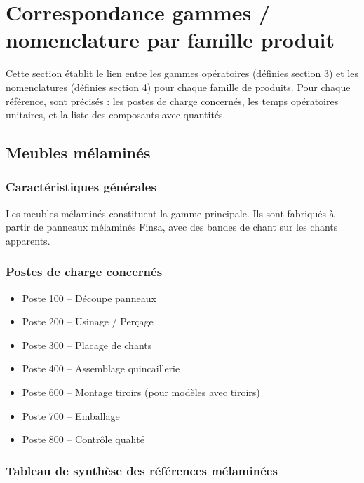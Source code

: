 \documentclass[12pt,a4paper]{article}
\begin{document}
\section{Correspondance gammes / nomenclature par famille produit}

Cette section établit le lien entre les gammes opératoires (définies section 3) et les nomenclatures (définies section 4) pour chaque famille de produits. Pour chaque référence, sont précisés : les postes de charge concernés, les temps opératoires unitaires, et la liste des composants avec quantités.

\subsection{Meubles mélaminés}

\subsubsection{Caractéristiques générales}
Les meubles mélaminés constituent la gamme principale. Ils sont fabriqués à partir de panneaux mélaminés Finsa, avec des bandes de chant sur les chants apparents.

\subsubsection{Postes de charge concernés}
\begin{itemize}
    \item Poste 100 – Découpe panneaux
    \item Poste 200 – Usinage / Perçage
    \item Poste 300 – Placage de chants
    \item Poste 400 – Assemblage quincaillerie
    \item Poste 600 – Montage tiroirs (pour modèles avec tiroirs)
    \item Poste 700 – Emballage
    \item Poste 800 – Contrôle qualité
\end{itemize}

\subsubsection{Tableau de synthèse des références mélaminées}
\end{document}
